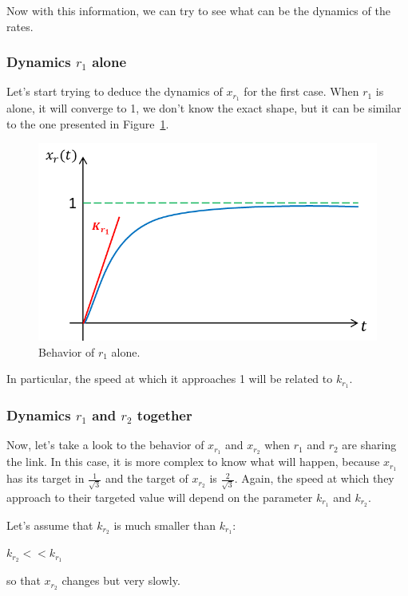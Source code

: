 Now with this information, we can try to see what can be the dynamics of the rates.

\subsubsection{Dynamics $r_1$ alone}
Let's start trying to deduce the dynamics of $x_{r_1}$ for the first case. When $r_1$ is alone, it will converge to 1, we don't know the exact shape, but it can be similar to the one presented in Figure~\ref{figur4}.

\begin{figure}[h!]
\centering
\includegraphics[scale=.6]{r1Alone}
\caption{Behavior of $r_1$ alone.}
\label{figur4}
\end{figure}

In particular, the speed at which it approaches 1 will be related to $k_{r_1}$.

\subsubsection{Dynamics $r_1$ and $r_2$ together}
Now, let's take a look to the behavior of $x_{r_1}$ and $x_{r_2}$ when $r_1$ and $r_2$ are sharing the link. In this case, it is more complex to know what will happen, because $x_{r_1}$ has its target in $\frac{1}{\sqrt{3}}$ and the target of $x_{r_2}$ is $\frac{2}{\sqrt{3}}$. Again, the speed at which they approach to their targeted value will depend on the parameter $k_{r_1}$ and $k_{r_2}$.

Let's assume that $k_{r_2}$ is much smaller than $k_{r_1}$:

\centerline{$k_{r_2} << k_{r_1}$}

so that $x_{r_2}$ changes but very slowly.

